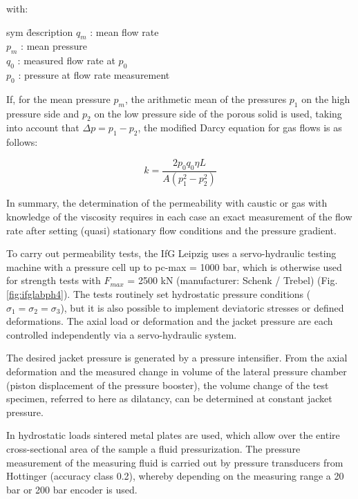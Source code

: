 with:
\begin{tabbing}
sym \= description \kill
$q_m$ : \> mean flow rate \\
$p_m$ : \> mean pressure \\
$q_0$ : \> measured flow rate at $p_0$ \\
$p_0$ : \> pressure at flow rate measurement 
\end{tabbing}

If, for the mean pressure $p_m$, the arithmetic mean of the pressures $p_1$ on the high pressure side and $p_2$ on the low pressure side of the porous solid is used, taking into account that $\Delta p = p_1 - p_2$, the modified Darcy equation for gas flows is as follows:

\begin{equation}
k = \frac{2p_0q_0\eta L}{A(p_1^2-p_2^2)}
\end{equation}

In summary, the determination of the permeability with caustic or gas with knowledge of the viscosity requires in each case an exact measurement of the flow rate after setting (quasi) stationary flow conditions and the pressure gradient.

To carry out permeability tests, the IfG Leipzig uses a servo-hydraulic testing machine with a pressure cell up to pc-max = 1000 bar, which is otherwise used for strength tests with $F_{max}$ = 2500 kN (manufacturer: Schenk / Trebel) (Fig. \ref{fig:ifglabph4}). The tests routinely set hydrostatic pressure conditions ($\sigma_1 = \sigma_2 = \sigma_3$), but it is also possible to implement deviatoric stresses or defined deformations. The axial load or deformation and the jacket pressure are each controlled 
independently via a servo-hydraulic system. 

The desired jacket pressure is generated by a pressure intensifier. From the axial deformation and the measured change in volume of the lateral pressure chamber (piston displacement of the pressure booster), the volume change of the test specimen, referred to here as dilatancy, can be determined at constant jacket pressure.

In hydrostatic loads sintered metal plates are used, which allow over the entire cross-sectional area of the sample a fluid pressurization. The pressure measurement of the measuring fluid is carried out by pressure transducers from Hottinger (accuracy class 0.2), whereby depending on the measuring range a 20 bar or 200 bar encoder is used.

